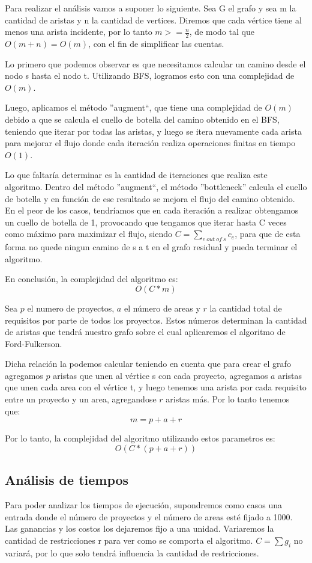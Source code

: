 Para realizar el análisis vamos a suponer lo siguiente. Sea G el grafo y sea m la cantidad de aristas y n la cantidad de vertices. Diremos que cada vértice tiene al menos una arista incidente, 
por lo tanto $m >= \frac{n}{2}$, de modo tal que $O(m + n) = O(m)$, con el fin de simplificar las cuentas.

Lo primero que podemos observar es que necesitamos calcular un camino desde el nodo s hasta el nodo t. Utilizando BFS, logramos esto con una complejidad de $O(m)$.

Luego, aplicamos el método ''augment``, que tiene una complejidad de $O(m)$ debido a que se calcula el cuello de botella del camino obtenido en el BFS, 
teniendo que iterar por todas las aristas, y luego se itera 
nuevamente cada arista para mejorar el flujo donde cada iteración realiza operaciones finitas 
en tiempo $O(1)$.

Lo que faltaría determinar es la cantidad de iteraciones que realiza este algoritmo.
Dentro del método ''augment``, el método ''bottleneck'' calcula el cuello de botella y en función de ese resultado se mejora el flujo del camino obtenido. En el peor de los casos, tendríamos que en cada 
iteración a realizar obtengamos un cuello de botella de 1, provocando que tengamos que iterar hasta C veces como máximo para maximizar el flujo, siendo $ C = \sum\limits_{e\ out\ of\ s} c_e$, 
para que de esta forma no quede ningun camino de s a t en el grafo residual y pueda terminar el algoritmo.

En conclusión, la complejidad del algoritmo es:
$$ O(C * m) $$

Sea $p$ el numero de proyectos, $a$ el número de areas y $r$ la cantidad total de requisitos por parte de todos los proyectos.
Estos números determinan la cantidad de aristas que tendrá nuestro grafo sobre el cual aplicaremos el algoritmo de Ford-Fulkerson.

Dicha relación la podemos calcular teniendo en cuenta que para crear el grafo agregamos $p$ aristas que unen al vértice s con cada proyecto, 
agregamos $a$ aristas que unen cada area con el vértice t, y luego tenemos una arista por cada requisito entre un proyecto y un area, agregandose $r$ aristas más. Por lo tanto tenemos que:
$$ m = p + a + r $$

Por lo tanto, la complejidad del algoritmo utilizando estos parametros es:
$$ O ( C * (p +a +r)) $$

\subsection{Análisis de tiempos}
Para poder analizar los tiempos de ejecución, supondremos como casos una entrada donde el número de proyectos y el número de areas esté fijado a 1000. Las ganancias y los costos los 
dejaremos fijo a una unidad. 
Variaremos la cantidad de restricciones r para ver como se comporta el algoritmo.
$C = \sum g_i$ no variará, por lo que solo tendrá influencia la cantidad de restricciones.


